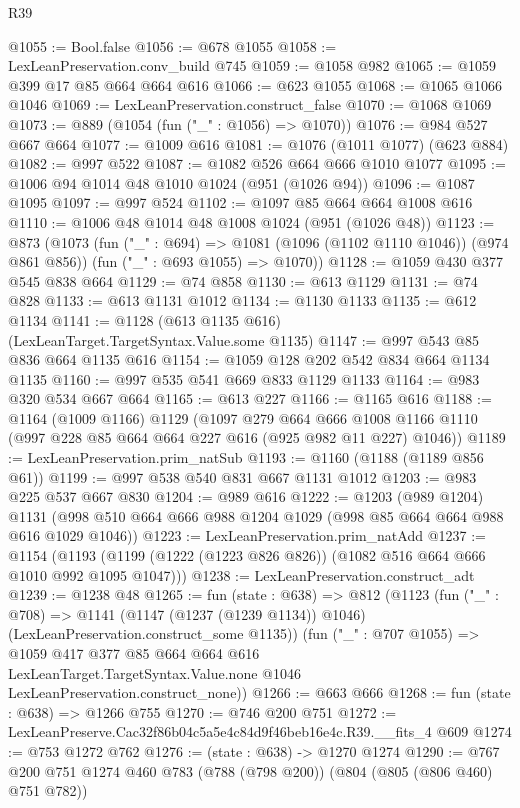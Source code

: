 \begin{lexlean}{R39}
\begin{coremodule}
@1055 := Bool.false
@1056 := @678 @1055
@1058 := LexLeanPreservation.conv_build @745
@1059 := @1058 @982
@1065 := @1059 @399 @17 @85 @664 @664 @616
@1066 := @623 @1055
@1068 := @1065 @1066 @1046
@1069 := LexLeanPreservation.construct_false
@1070 := @1068 @1069
@1073 := @889 (@1054 (fun ("_" : @1056) => @1070))
@1076 := @984 @527 @667 @664
@1077 := @1009 @616
@1081 := @1076 (@1011 @1077) (@623 @884)
@1082 := @997 @522
@1087 := @1082 @526 @664 @666 @1010 @1077
@1095 := @1006 @94 @1014 @48 @1010 @1024 (@951 (@1026 @94))
@1096 := @1087 @1095
@1097 := @997 @524
@1102 := @1097 @85 @664 @664 @1008 @616
@1110 := @1006 @48 @1014 @48 @1008 @1024 (@951 (@1026 @48))
@1123 := @873
    (@1073
      (fun ("_" : @694) => @1081 (@1096 (@1102 @1110 @1046)) (@974 @861 @856))
      (fun ("_" : @693 @1055) => @1070))
@1128 := @1059 @430 @377 @545 @838 @664
@1129 := @74 @858
@1130 := @613 @1129
@1131 := @74 @828
@1133 := @613 @1131 @1012
@1134 := @1130 @1133
@1135 := @612 @1134
@1141 := @1128 (@613 @1135 @616) (LexLeanTarget.TargetSyntax.Value.some @1135)
@1147 := @997 @543 @85 @836 @664 @1135 @616
@1154 := @1059 @128 @202 @542 @834 @664 @1134 @1135
@1160 := @997 @535 @541 @669 @833 @1129 @1133
@1164 := @983 @320 @534 @667 @664
@1165 := @613 @227
@1166 := @1165 @616
@1188 := @1164
    (@1009 @1166)
    @1129
    (@1097
      @279
      @664
      @666
      @1008
      @1166
      @1110
      (@997 @228 @85 @664 @664 @227 @616 (@925 @982 @11 @227) @1046))
@1189 := LexLeanPreservation.prim_natSub
@1193 := @1160 (@1188 (@1189 @856 @61))
@1199 := @997 @538 @540 @831 @667 @1131 @1012
@1203 := @983 @225 @537 @667 @830
@1204 := @989 @616
@1222 := @1203
    (@989 @1204)
    @1131
    (@998 @510 @664 @666 @988 @1204 @1029 (@998 @85 @664 @664 @988 @616 @1029 @1046))
@1223 := LexLeanPreservation.prim_natAdd
@1237 := @1154
    (@1193 (@1199 (@1222 (@1223 @826 @826)) (@1082 @516 @664 @666 @1010 @992 @1095 @1047)))
@1238 := LexLeanPreservation.construct_adt
@1239 := @1238 @48
@1265 := fun (state : @638) =>
  @812
    (@1123
      (fun ("_" : @708) =>
      @1141 (@1147 (@1237 (@1239 @1134)) @1046) (LexLeanPreservation.construct_some @1135))
      (fun ("_" : @707 @1055) =>
      @1059
        @417
        @377
        @85
        @664
        @664
        @616
        LexLeanTarget.TargetSyntax.Value.none
        @1046
        LexLeanPreservation.construct_none))
@1266 := @663 @666
@1268 := fun (state : @638) => @1266 @755
@1270 := @746 @200 @751
@1272 := LexLeanPreserve.Cac32f86b04c5a5e4c84d9f46beb16e4c.R39.__fits_4 @609
@1274 := @753 @1272 @762
@1276 := (state : @638) -> @1270 @1274
@1290 := @767 @200 @751 @1274 @460 @783 (@788 (@798 @200)) (@804 (@805 (@806 @460) @751 @782))

\end{coremodule}
\end{lexlean}
